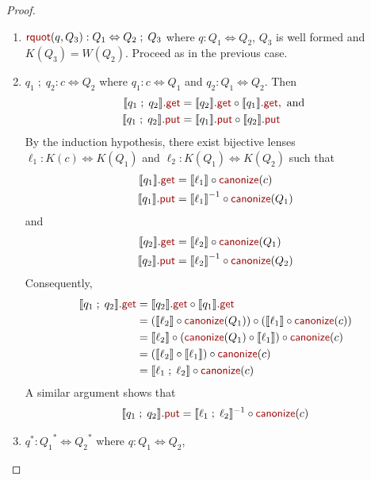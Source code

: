 \documentclass[acmsmall,review,anonymous]{acmart}
\newcommand{\kw}[1]{\textcolor{dkred}{\ensuremath{\mathsf{#1}}}}
\newcommand{\canonize}{\ensuremath{\kw{canonize}}}
\newcommand{\get}{\ensuremath{\kw{get}}}
\newcommand{\lput}{\ensuremath{\kw{put}}}
\newcommand{\rquot}{\ensuremath{\kw{rquot}}}
\begin{document}
\begin{proof}
\begin{enumerate}
\item
$\rquot(q, Q_3):Q_1 \Leftrightarrow Q_2 \; ; \; Q_3$ where $q : Q_1
\Leftrightarrow Q_2$, $Q_3$ is well formed and $K(Q_3) = W(Q_2)$. Proceed as in
the previous case.
\item
$q_1 \; ; \; q_2: c \Leftrightarrow Q_2$ where $q_1 : c \Leftrightarrow Q_1$ and
$q_2 : Q_1 \Leftrightarrow Q_2$. Then
\begin{align*}
\llbracket q_1 \; ; \; q_2 \rrbracket.\get &= \llbracket q_2
\rrbracket.\get\circ \llbracket q_1 \rrbracket.\get, \text{ and }\\
\llbracket q_1 \; ; \; q_2 \rrbracket.\lput &= \llbracket q_1 \rrbracket.\lput
\circ \llbracket q_2 \rrbracket.\lput
\end{align*}
By the induction hypothesis, there exist bijective lenses
$\ell_1 :
K(c) \Leftrightarrow K(Q_1)$ and $\ell_2 : K(Q_1) \Leftrightarrow K(Q_2)$ such
that
\begin{align*}
\llbracket q_1 \rrbracket.\get &= \llbracket \ell_1 \rrbracket \circ
\canonize(c)\\
\llbracket q_1 \rrbracket.\lput &= {\llbracket \ell_1 \rrbracket}^{-1} \circ
\canonize(Q_1)
\end{align*}
and
\begin{align*}
\llbracket q_2 \rrbracket.\get &= \llbracket \ell_2 \rrbracket \circ
\canonize(Q_1)\\
\llbracket q_2 \rrbracket.\lput &= {\llbracket \ell_2 \rrbracket}^{-1} \circ
\canonize(Q_2)
\end{align*}
Consequently,
\begin{align*}
\llbracket q_1 \; ; \; q_2 \rrbracket.\get &=
\llbracket q_2 \rrbracket.\get \circ \llbracket q_1 \rrbracket.\get \\
&=(\llbracket \ell_2 \rrbracket \circ \canonize(Q_1)) \circ (\llbracket \ell_1
\rrbracket \circ \canonize(c))\\
&= \llbracket \ell_2 \rrbracket \circ (\canonize(Q_1) \circ \llbracket \ell_1
\rrbracket) \circ \canonize(c)\\
&= (\llbracket \ell_2 \rrbracket \circ \llbracket \ell_1 \rrbracket) \circ
\canonize(c)\\
&= \llbracket \ell_1 \; ; \; \ell_2 \rrbracket \circ
\canonize(c)
\end{align*}
A similar argument shows that
$$\llbracket q_1 \; ; \; q_2 \rrbracket.\lput =
\llbracket \ell_1 \; ; \; \ell_2 \rrbracket^{-1} \circ
\canonize(c)$$
\item
$q^* : {Q_1}^* \Leftrightarrow {Q_2}^*$ where $q : Q_1 \Leftrightarrow Q_2$,

\end{enumerate}
\end{proof}
\end{document}
